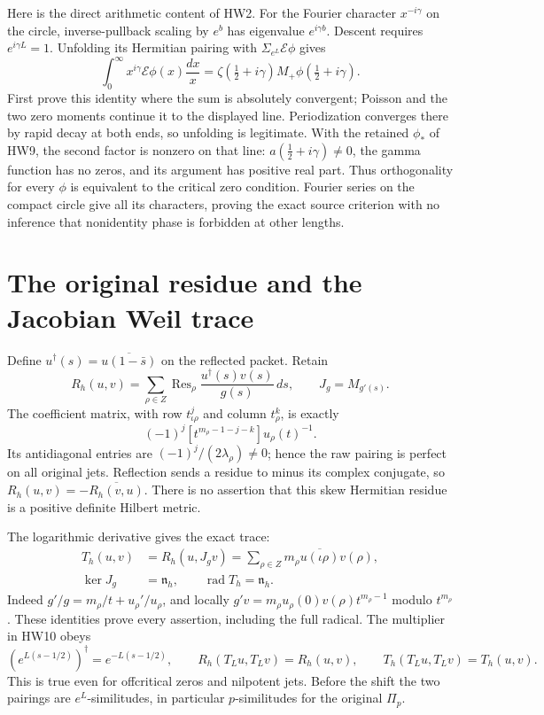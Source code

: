\documentclass[11pt]{article}
\newcommand{\Res}{\operatorname{Res}}
\begin{document}
Here is the direct arithmetic content of HW2. For the Fourier
character \(x^{-i\gamma}\) on the circle, inverse-pullback
scaling by \(e^b\) has eigenvalue \(e^{i\gamma b}\).
Descent requires \(e^{i\gamma L}=1\).
Unfolding its Hermitian pairing with
\(\Sigma_{e^L}\mathcal E\phi\) gives
\[
 \int_0^\infty x^{i\gamma}\mathcal E\phi(x)\frac{dx}{x}
   =\zeta(\tfrac12+i\gamma)
      M_+\phi(\tfrac12+i\gamma).
 \tag{HW18}
\]
First prove this identity where the sum is absolutely convergent;
Poisson and the two zero moments continue it to the displayed
line. Periodization converges there by rapid decay at both
ends, so unfolding is legitimate. With the retained
\(\phi_*\) of HW9, the second factor is nonzero on that line:
\(a(\tfrac12+i\gamma)\ne0\), the gamma function has no zeros,
and its argument has positive real part. Thus orthogonality
for every \(\phi\) is equivalent to the critical zero condition.
Fourier series on the compact circle give all its characters,
proving the exact source criterion with no inference that
nonidentity phase is forbidden at other lengths.

\section{The original residue and the Jacobian Weil trace}

Define \(u^\dagger(s)=\overline{u(1-\bar s)}\) on the
reflected packet. Retain
\[
 R_h(u,v)=\sum_{\rho\in Z}\Res_\rho
          \frac{u^\dagger(s)v(s)}{g(s)}\,ds,\qquad
 J_g=M_{g'(s)}.
 \tag{HW19}
\]
The coefficient matrix, with row \(t_{\iota\rho}^j\) and
column \(t_\rho^k\), is exactly
\[
 (-1)^j[t^{m_\rho-1-j-k}]u_\rho(t)^{-1}.
 \tag{HW20}
\]
Its antidiagonal entries are
\((-1)^j/(2\lambda_\rho)\ne0\); hence the raw pairing is
perfect on all original jets. Reflection sends a residue to
minus its complex conjugate, so
\(R_h(u,v)=-\overline{R_h(v,u)}\).
There is no assertion that this skew Hermitian residue is a
positive definite Hilbert metric.

The logarithmic derivative gives the exact trace:
\[
 \begin{split}
 T_h(u,v)&=R_h(u,J_gv)
       =\sum_{\rho\in Z}m_\rho
                      \overline{u(\iota\rho)}v(\rho),\\
 \ker J_g&=\mathfrak n_h,\qquad
 \operatorname{rad}T_h=\mathfrak n_h .
 \end{split}
 \tag{HW21}\label{hw:weilpacket}
\]
Indeed \(g'/g=m_\rho/t+u_\rho'/u_\rho\), and locally
\(g'v=m_\rho u_\rho(0)v(\rho)t^{m_\rho-1}\) modulo
\(t^{m_\rho}\). These identities prove every assertion,
including the full radical.
The multiplier in HW10 obeys
\[
 (e^{L(s-1/2)})^\dagger=e^{-L(s-1/2)},\qquad
 R_h(T_Lu,T_Lv)=R_h(u,v),\qquad
 T_h(T_Lu,T_Lv)=T_h(u,v).
 \tag{HW22}\label{hw:isometry}
\]
This is true even for offcritical zeros and nilpotent jets.
Before the shift the two pairings are \(e^L\)-similitudes,
in particular \(p\)-similitudes for the original \(\Pi_p\).
\end{document}
